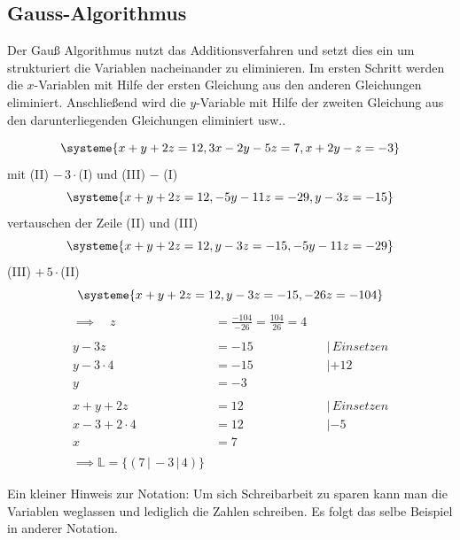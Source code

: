\documentclass[a4paper,12pt]{article}
\newcommand{\Beispiel}[1]{
	\vspace*{0.2cm}
	\begin{tcolorbox}[breakable,colback=yellow!0,colframe=green!65!black,title=\textbf{Beispiel:},width=\linewidth ]
		{#1}
	\end{tcolorbox}
}
\begin{document}
	\subsection{Gauss-Algorithmus}
	Der Gauß Algorithmus nutzt das Additionsverfahren und setzt dies ein um strukturiert die Variablen nacheinander zu eliminieren. Im ersten Schritt werden die $x$-Variablen mit Hilfe der ersten Gleichung aus den anderen Gleichungen eliminiert. Anschließend wird die $y$-Variable mit Hilfe der zweiten Gleichung aus den darunterliegenden Gleichungen eliminiert usw..
	\Beispiel{
		\[\systeme{
			x+y+2z=12,
			3x-2y-5z=7,
			x+2y-z=-3
		}\]
		mit (II) $-\,3\cdot$(I) und (III) $-$ (I) 
		\[\systeme{
			x+y+2z=12,
			-5y-11z=-29,
			y-3z=-15
		}\]
		vertauschen der Zeile (II) und (III)
		\[\systeme{
			x+y+2z=12,
			y-3z=-15,
			-5y-11z=-29
		}\]
		(III) $+\, 5\cdot $(II)
		\[\systeme{
			x+y+2z=12,
			y-3z=-15,
			-26z=-104
		}\]
	\begin{align*}
		\implies \quad z&=\frac{-104}{-26}=\frac{104}{26}=4\\\\
		y-3z&=-15&&| \,Einsetzen\\
		y-3\cdot 4&=-15		&& | +12\\
		y&=-3\\\\
		x+y+2z&=12 &&|\, Einsetzen\\
		x-3+2\cdot 4&=12&&| -5\\
		x&=7\\\\
		\implies \mathds{L}=\{(7\,|\,-3\,|\,4)\}
	\end{align*}
	}
Ein kleiner Hinweis zur Notation: Um sich Schreibarbeit zu sparen kann man die Variablen weglassen und lediglich die Zahlen schreiben. Es folgt das selbe Beispiel in anderer Notation.
\end{document}
